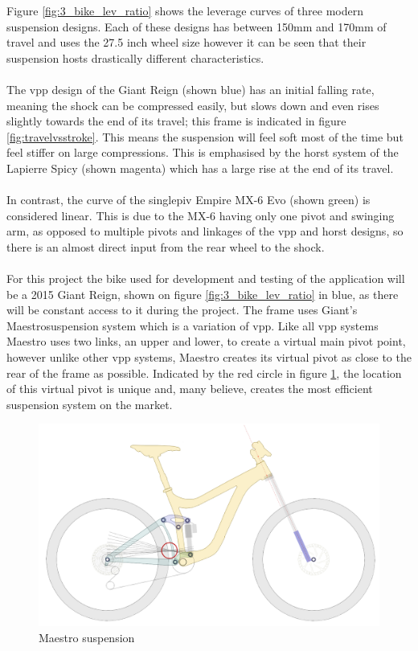 		Figure \ref{fig:3_bike_lev_ratio} shows the leverage curves of three modern suspension designs. Each of these designs has between 150mm and 170mm of travel and uses the 27.5 inch wheel size however it can be seen that their suspension hosts drastically different characteristics. 
		\\\\
		The \gls{vpp} design of the Giant Reign (shown blue) has an initial falling rate, meaning 
		the \gls{shock} can be compressed easily, but slows down and even rises slightly towards 
		the end of its travel; this frame is indicated in figure \ref{fig:travelvsstroke}. This 
		means the suspension will feel soft most of the time but feel stiffer on large 
		compressions. This is emphasised by the \gls{horst} system of the Lapierre Spicy (shown 
		magenta) which has a large rise at the end of its travel.
		\\\\
		In contrast, the curve of the \gls{singlepiv} Empire MX-6 Evo (shown green) is considered linear. This is due to the MX-6 having only one pivot and swinging arm, as opposed to multiple pivots and linkages of the \gls{vpp} and \gls{horst} designs, so there is an almost direct input from the rear wheel to the \gls{shock}.
		\\\\
		For this project the bike used for development and testing of the application will be a 2015 Giant Reign, shown on figure \ref{fig:3_bike_lev_ratio} in blue, as there will be constant access to it during the project. The frame uses Giant's Maestro\texttrademark suspension system which is a variation of \gls{vpp}. Like all \gls{vpp} systems Maestro uses two links, an upper and lower, to create a virtual main pivot point, however unlike other \gls{vpp} systems, Maestro creates its virtual pivot as close to the rear of the frame as possible. Indicated by the red circle in figure \ref{fig:maestro}, the location of this virtual pivot is unique and, many believe, creates the most efficient suspension system on the market.
		\begin{figure}[h!]
			\centering
			\includegraphics[width=12cm]{../images/reignsch.PNG}
			\caption{Maestro suspension}
			\label{fig:maestro}
		\end{figure}
